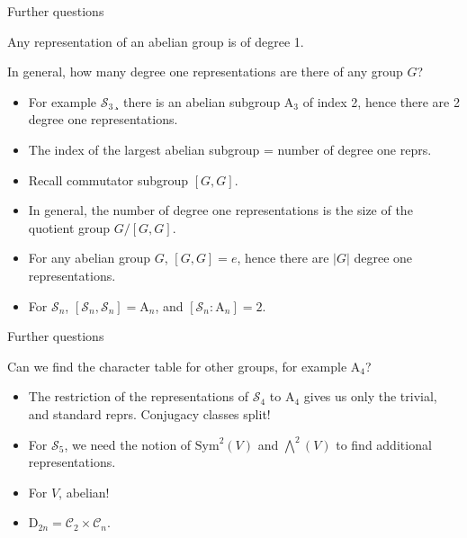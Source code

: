 \documentclass[10pt]{beamer}
\newcommand{\Sym}{\mathcal{S}}
\newcommand{\Cyc}{\mathcal{C}}
\begin{document}
\begin{frame}{Further questions}
	\begin{corollary}
		Any representation of an abelian group is of degree 1.
	\end{corollary}
	
	\begin{block}{In general, how many degree one representations are there of any group $G$?}
		\begin{itemize}
			\item For example $\Sym_3$¸ there is an abelian subgroup $\text{A}_3$ of index 2, hence there are 2 degree one representations.
			
			\item The index of the largest abelian subgroup = number of degree one reprs.
			
			\item Recall commutator subgroup $[G,G]$.
			
			\item In general, the number of degree one representations is the size of the quotient group $G/[G,G]$.
			
			\item For any abelian group $G$, $[G,G]=e$, hence there are $|G|$ degree one representations.
			
			\item For $\Sym_n$, $[\Sym_n,\Sym_n] = \text{A}_n$, and $[\Sym_n:\text{A}_n] = 2$.
		\end{itemize}
	\end{block}
\end{frame}
\begin{frame}{Further questions}
	\begin{block}{Can we find the character table for other groups, for example $\text{A}_4$?}
		\begin{itemize}
			\item The restriction of the representations of $\Sym_4$ to $\text{A}_4$ gives us only the trivial, and standard reprs. Conjugacy classes split! 
			
			\item For $\Sym_5$, we need the notion of $\text{Sym}^2(V)$ and $\bigwedge^2(V)$ to find additional representations.
			
			\item For $V$, abelian! 
			
			\item $\text{D}_{2n} = \Cyc_2 \times \Cyc_n$.
		\end{itemize}
	\end{block}
	
\end{frame}	
\end{document}
